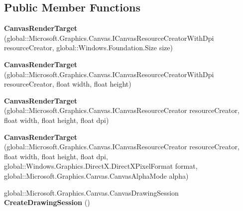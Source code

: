 \subsection*{Public Member Functions}
\begin{DoxyCompactItemize}
\item 
\mbox{\label{class_microsoft_1_1_graphics_1_1_canvas_1_1_canvas_render_target_a6e7619cdae74a3f3f23f3ad70840e69c}} 
{\bfseries Canvas\+Render\+Target} (global\+::\+Microsoft.\+Graphics.\+Canvas.\+I\+Canvas\+Resource\+Creator\+With\+Dpi resource\+Creator, global\+::\+Windows.\+Foundation.\+Size size)
\item 
\mbox{\label{class_microsoft_1_1_graphics_1_1_canvas_1_1_canvas_render_target_a1ebbe6ada521c806eb64d35b3c9d1c23}} 
{\bfseries Canvas\+Render\+Target} (global\+::\+Microsoft.\+Graphics.\+Canvas.\+I\+Canvas\+Resource\+Creator\+With\+Dpi resource\+Creator, float width, float height)
\item 
\mbox{\label{class_microsoft_1_1_graphics_1_1_canvas_1_1_canvas_render_target_a397381500ed5d38d360913faaac5baac}} 
{\bfseries Canvas\+Render\+Target} (global\+::\+Microsoft.\+Graphics.\+Canvas.\+I\+Canvas\+Resource\+Creator resource\+Creator, float width, float height, float dpi)
\item 
\mbox{\label{class_microsoft_1_1_graphics_1_1_canvas_1_1_canvas_render_target_a69d75f14eb0e74873b4a8ffb803dec0f}} 
{\bfseries Canvas\+Render\+Target} (global\+::\+Microsoft.\+Graphics.\+Canvas.\+I\+Canvas\+Resource\+Creator resource\+Creator, float width, float height, float dpi, global\+::\+Windows.\+Graphics.\+Direct\+X.\+Direct\+X\+Pixel\+Format format, global\+::\+Microsoft.\+Graphics.\+Canvas.\+Canvas\+Alpha\+Mode alpha)
\item 
\mbox{\label{class_microsoft_1_1_graphics_1_1_canvas_1_1_canvas_render_target_a12a2480b49988d0269ab6b58cc3a8433}} 
global\+::\+Microsoft.\+Graphics.\+Canvas.\+Canvas\+Drawing\+Session {\bfseries Create\+Drawing\+Session} ()
\item 

\end{DoxyCompactItemize}

